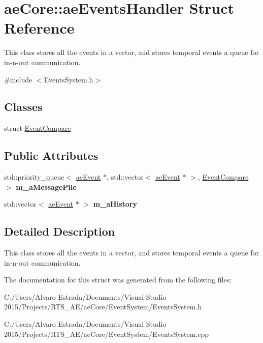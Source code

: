 \hypertarget{structae_core_1_1ae_events_handler}{}\section{ae\+Core\+:\+:ae\+Events\+Handler Struct Reference}
\label{structae_core_1_1ae_events_handler}


This class stores all the events in a vector, and stores temporal events a queue for in-\/n-\/out communication.  




{\ttfamily \#include $<$Events\+System.\+h$>$}

\subsection*{Classes}
\begin{DoxyCompactItemize}
\item 
struct \hyperlink{structae_core_1_1ae_events_handler_1_1_event_compare}{Event\+Compare}
\end{DoxyCompactItemize}
\subsection*{Public Attributes}
\begin{DoxyCompactItemize}
\item 
std\+::priority\+\_\+queue$<$ \hyperlink{structae_core_1_1ae_event}{ae\+Event} $\ast$, std\+::vector$<$ \hyperlink{structae_core_1_1ae_event}{ae\+Event} $\ast$ $>$, \hyperlink{structae_core_1_1ae_events_handler_1_1_event_compare}{Event\+Compare} $>$ {\bfseries m\+\_\+a\+Message\+Pile}\hypertarget{structae_core_1_1ae_events_handler_a34477930b3369b9ee1977f548575a512}{}\label{structae_core_1_1ae_events_handler_a34477930b3369b9ee1977f548575a512}

\item 
std\+::vector$<$ \hyperlink{structae_core_1_1ae_event}{ae\+Event} $\ast$ $>$ {\bfseries m\+\_\+a\+History}\hypertarget{structae_core_1_1ae_events_handler_aaa6d8d9debd62ad2d8b905d25d8e7c14}{}\label{structae_core_1_1ae_events_handler_aaa6d8d9debd62ad2d8b905d25d8e7c14}

\end{DoxyCompactItemize}


\subsection{Detailed Description}
This class stores all the events in a vector, and stores temporal events a queue for in-\/n-\/out communication. 

The documentation for this struct was generated from the following files\+:\begin{DoxyCompactItemize}
\item 
C\+:/\+Users/\+Alvaro Estrada/\+Documents/\+Visual Studio 2015/\+Projects/\+R\+T\+S\+\_\+\+A\+E/ae\+Core/\+Event\+System/Events\+System.\+h\item 
C\+:/\+Users/\+Alvaro Estrada/\+Documents/\+Visual Studio 2015/\+Projects/\+R\+T\+S\+\_\+\+A\+E/ae\+Core/\+Event\+System/Events\+System.\+cpp\end{DoxyCompactItemize}
